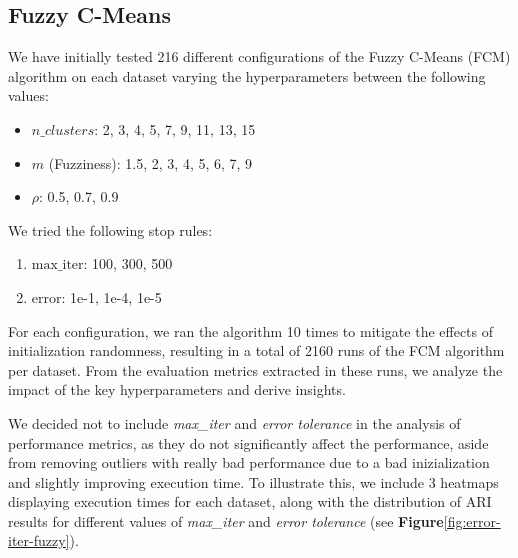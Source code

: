 
\subsection{Fuzzy C-Means}

We have initially tested 216 different configurations of the Fuzzy C-Means (FCM) algorithm on each dataset varying the hyperparameters between the following values:

\begin{itemize}
  \item $n\_clusters$: 2, 3, 4, 5, 7, 9, 11, 13, 15
  \item $m$ (Fuzziness): 1.5, 2, 3, 4, 5, 6, 7, 9
  \item $ \rho $: 0.5, 0.7, 0.9
\end{itemize}

We tried the following stop rules:
\begin{enumerate}
	\item \( \text{max\_iter} \): 100, 300, 500
	\item \( \text{error} \): 1e-1, 1e-4, 1e-5
\end{enumerate}


For each configuration, we ran the algorithm 10 times to mitigate the effects of initialization randomness, resulting in a total of 2160 runs of the FCM algorithm per dataset. From the evaluation metrics extracted in these runs, we analyze the impact of the key hyperparameters and derive insights.

We decided not to include \textit{max\_iter} and \textit{error tolerance} in the analysis of performance metrics, as they do not significantly affect the performance, aside from removing outliers with really bad performance due to a bad inizialization and slightly improving execution time. To illustrate this, we include 3 heatmaps displaying execution times for each dataset, along with the distribution of ARI results for different values of \textit{max\_iter} and \textit{error tolerance} (see \textbf{Figure}\ref{fig:error-iter-fuzzy}).

